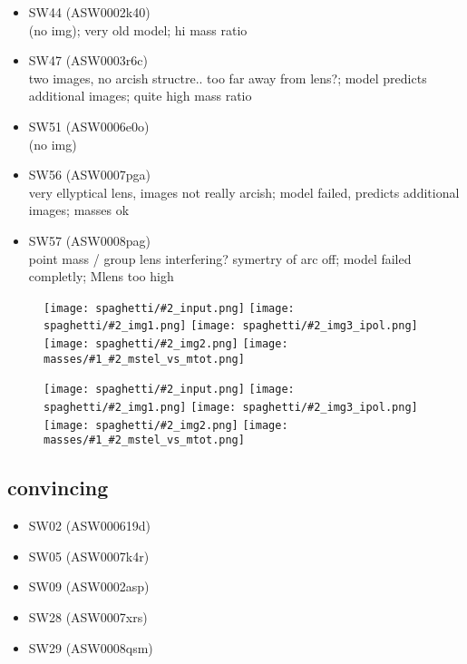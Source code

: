\documentclass[a4paper,fleqn,usenatbib]{mnras}
\newcommand{\inclfig}[2]{
  \texttt{[image: spaghetti/\#2\_input.png]}
  \texttt{[image: spaghetti/\#2\_img1.png]}
  \texttt{[image: spaghetti/\#2\_img3\_ipol.png]}
  \texttt{[image: spaghetti/\#2\_img2.png]}
  \texttt{[image: masses/\#1\_\#2\_mstel\_vs\_mtot.png]}
}
\begin{document}
\begin{itemize}
  \item SW44 (ASW0002k40) \\
  (no img);
  very old model;
  hi mass ratio
  
  \item SW47 (ASW0003r6c) \\
  two images, no arcish structre.. too far away from lens?;
  model predicts additional images;
  quite high mass ratio
  
  \item SW51 (ASW0006e0o) \\
  (no img)
  
  \item SW56 (ASW0007pga) \\
  very ellyptical lens, images not really arcish;
  model failed, predicts additional images;
  masses ok
  
  \item SW57 (ASW0008pag) \\
  point mass / group lens interfering? symertry of arc off;
  model failed completly;
  Mlens too high
  
\end{itemize}


\begin{figure}
	\inclfig{SW19}{ASW0001ld7_OS3CYAKLRT}
\end{figure}


\begin{figure}
	\inclfig{SW57}{ASW0008pag_5SXGXQYY6V}
\end{figure}



\subsection{convincing}
\begin{itemize}
  \item SW02 (ASW000619d) \\
  
    
  \item SW05 (ASW0007k4r) \\
  
  \item SW09 (ASW0002asp) \\
  
  \item SW28 (ASW0007xrs) \\
  
  \item SW29 (ASW0008qsm) \\
  
\end{itemize}
\end{document}

